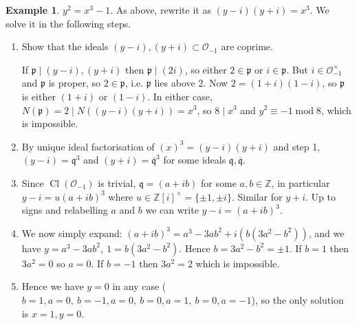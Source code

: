 \documentclass{article}
\newcommand{\Z}{\mathbb{Z}}
\newcommand{\Mod}{\operatorname{mod}}
\newcommand{\Cl}{\operatorname{Cl}}
\newcommand{\ri}{\mathcal{O}}
\newcommand{\ip}{\mathfrak{p}}
\newcommand{\iq}{\mathfrak{q}}
\theoremstyle{definition}
\newtheorem{example}[defn]{Example}
\begin{document}
\begin{example}
$y^2=x^3-1$. As above, rewrite it as $(y-i)(y+i)=x^3$. We solve it in the following steps.
\begin{enumerate}
\item Show that the ideals $(y-i),(y+i)\subset\ri_{-1}$ are coprime.

If $\ip\mid(y-i),(y+i)$ then $\ip\mid (2i)$, so either $2\in\ip$ or $i\in\ip$. But $i\in\ri_{-1}^\times$ and $\ip$ is proper, so $2\in\ip$, i.e. $\ip$ lies above 2. Now $2=(1+i)(1-i)$, so $\ip$ is either $(1+i)$ or $(1-i)$. In either case, $N(\ip)=2\mid N((y-i)(y+i))=x^3$, so $8\mid x^3$ and $y^2\equiv -1\Mod 8$, which is impossible. 
\item By unique ideal factorisation of $(x)^3=(y-i)(y+i)$ and step 1, $(y-i)=\iq^3$ and $(y+i)={\overline{\iq}}^3$ for some ideals $\iq,\overline{\iq}$.
\item Since $\Cl(\ri_{-1})$ is trivial, $\iq=(a+ib)$ for some $a,b\in\Z$, in particular $y-i=u(a+ib)^3$ where $u\in\Z[i]^\times=\{\pm 1,\pm i\}$. Similar for $y+i$. Up to signs and relabelling $a$ and $b$ we can write $y-i=(a+ib)^3$.
\item We now simply expand: $(a+ib)^3=a^3-3ab^2+i\left(b\left(3a^2-b^2\right)\right)$, and we have $y=a^3-3ab^2,\ 1=b\left(3a^2-b^2\right)$. Hence $b=3a^2-b^2=\pm 1$. If $b=1$ then $3a^2=0$ so $a=0$. If $b=-1$ then $3a^2=2$ which is impossible.
\item Hence we have $y=0$ in any case ($b=1,a=0,\ b=-1,a=0,\ b=0,a=1,\ b=0,a=-1$), so the only solution is $x=1,y=0$.
\end{enumerate}
\end{example}
\end{document}

